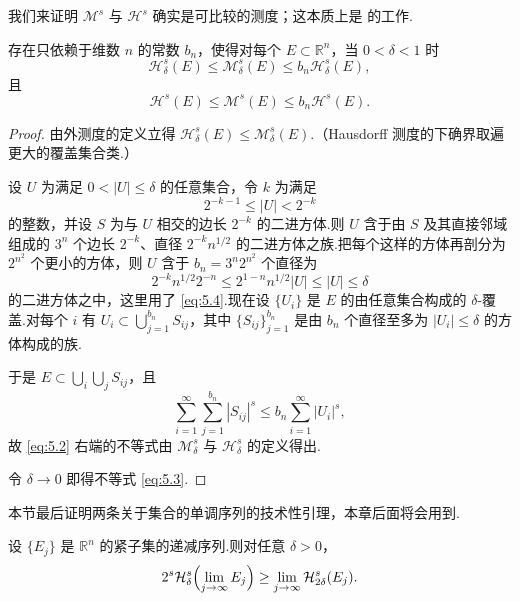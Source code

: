 我们来证明 $\mathcal{M}^s$ 与 $\mathcal{H}^s$ 确实是可比较的测度；这本质上是 \textcite{besicovitch1952} 的工作.

\begin{theorem}\label{thm:5.1}
存在只依赖于维数 $n$ 的常数 $b_n$，使得对每个 $E\subset\mathbb{R}^n$，当 $0<\delta<1$ 时
\begin{equation}\label{eq:5.2}
  \mathcal{H}^{s}_{\delta}(E)\leq\mathcal{M}^{s}_{\delta}(E)\leq b_n\mathcal{H}^{s}_{\delta}(E),
\end{equation}
且
\begin{equation}\label{eq:5.3}
  \mathcal{H}^{s}(E)\leq\mathcal{M}^{s}(E)\leq b_n\mathcal{H}^{s}(E).
\end{equation}
\end{theorem}

\begin{proof}
由外测度的定义立得 $\mathcal{H}^s_{\delta}(E)\leq\mathcal{M}^s_{\delta}(E)$.（Hausdorff 测度的下确界取遍更大的覆盖集合类.）

设 $U$ 为满足 $0<|U|\leq\delta$ 的任意集合，令 $k$ 为满足
\begin{equation}\label{eq:5.4}
  2^{-k-1}\leq|U|<2^{-k}
\end{equation}
的整数，并设 $S$ 为与 $U$ 相交的边长 $2^{-k}$ 的二进方体.则 $U$ 含于由 $S$ 及其直接邻域组成的 $3^n$ 个边长 $2^{-k}$、直径 $2^{-k}n^{1/2}$ 的二进方体之族.把每个这样的方体再剖分为 $2^{n^2}$ 个更小的方体，则 $U$ 含于 $b_n=3^n2^{n^2}$ 个直径为
\begin{equation}\label{eq:5.5}
  2^{-k}n^{1/2}2^{-n}\leq 2^{1-n}n^{1/2}|U|\leq|U|\leq\delta
\end{equation}
的二进方体之中，这里用了 \eqref{eq:5.4}.现在设 $\{U_i\}$ 是 $E$ 的由任意集合构成的 $\delta$-覆盖.对每个 $i$ 有 $U_i\subset\bigcup_{j=1}^{b_n}S_{ij}$，其中 $\{S_{ij}\}_{j=1}^{b_n}$ 是由 $b_n$ 个直径至多为 $|U_i|\leq\delta$ 的方体构成的族.

于是 $E\subset\bigcup_{i}\bigcup_{j}S_{ij}$，且
\[
  \sum_{i=1}^{\infty}\sum_{j=1}^{b_n}|S_{ij}|^{s}\leq b_n\sum_{i=1}^{\infty}|U_i|^{s},
\]
故 \eqref{eq:5.2} 右端的不等式由 $\mathcal{M}^s_{\delta}$ 与 $\mathcal{H}^s_{\delta}$ 的定义得出.

令 $\delta\to 0$ 即得不等式 \eqref{eq:5.3}.
\end{proof}

本节最后证明两条关于集合的单调序列的技术性引理，本章后面将会用到.

\begin{lemma}\label{lem:5.2}
设 $\{E_j\}$ 是 $\mathbb{R}^n$ 的紧子集的递减序列.则对任意 $\delta>0$，
\begin{equation}\label{eq:5.6}
  2^{s}\mathcal{H}^{s}_{\delta}\Bigl(\lim_{j\to\infty}E_j\Bigr)\geq\lim_{j\to\infty}\mathcal{H}^{s}_{2\delta}(E_j).
\end{equation}
\end{lemma}


